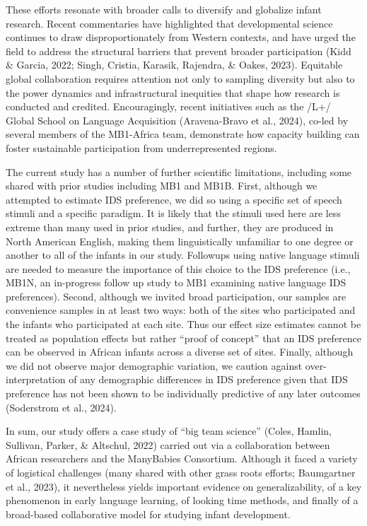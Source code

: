 \documentclass[
  english,
  ,man,floatsintext]{apa6}
\begin{document}
These efforts resonate with broader calls to diversify and globalize infant research. Recent commentaries have highlighted that developmental science continues to draw disproportionately from Western contexts, and have urged the field to address the structural barriers that prevent broader participation (Kidd \& Garcia, 2022; Singh, Cristia, Karasik, Rajendra, \& Oakes, 2023). Equitable global collaboration requires attention not only to sampling diversity but also to the power dynamics and infrastructural inequities that shape how research is conducted and credited. Encouragingly, recent initiatives such as the /L+/ Global School on Language Acquisition (Aravena-Bravo et al., 2024), co-led by several members of the MB1-Africa team, demonstrate how capacity building can foster sustainable participation from underrepresented regions.

The current study has a number of further scientific limitations, including some shared with prior studies including MB1 and MB1B. First, although we attempted to estimate IDS preference, we did so using a specific set of speech stimuli and a specific paradigm. It is likely that the stimuli used here are less extreme than many used in prior studies, and further, they are produced in North American English, making them linguistically unfamiliar to one degree or another to all of the infants in our study. Followups using native language stimuli are needed to measure the importance of this choice to the IDS preference (i.e., MB1N, an in-progress follow up study to MB1 examining native language IDS preferences). Second, although we invited broad participation, our samples are convenience samples in at least two ways: both of the sites who participated and the infants who participated at each site. Thus our effect size estimates cannot be treated as population effects but rather ``proof of concept'' that an IDS preference can be observed in African infants across a diverse set of sites. Finally, although we did not observe major demographic variation, we caution against over-interpretation of any demographic differences in IDS preference given that IDS preference has not been shown to be individually predictive of any later outcomes (Soderstrom et al., 2024).

In sum, our study offers a case study of ``big team science'' (Coles, Hamlin, Sullivan, Parker, \& Altschul, 2022) carried out via a collaboration between African researchers and the ManyBabies Consortium. Although it faced a variety of logistical challenges (many shared with other grass roots efforts; Baumgartner et al., 2023), it nevertheless yields important evidence on generalizability, of a key phenomenon in early language learning, of looking time methods, and finally of a broad-based collaborative model for studying infant development.
\end{document}
